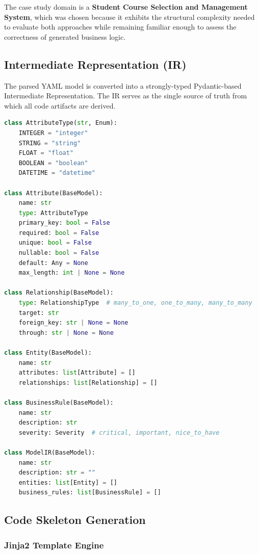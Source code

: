 \documentclass[11pt,a4paper]{article}
\begin{document}
The case study domain is a \textbf{Student Course Selection and Management System}, which was chosen because it exhibits the structural complexity needed to evaluate both approaches while remaining familiar enough to assess the correctness of generated business logic.

\subsection{Intermediate Representation (IR)}

The parsed YAML model is converted into a strongly-typed Pydantic-based Intermediate Representation. The IR serves as the single source of truth from which all code artifacts are derived.

\begin{lstlisting}[language=Python, caption={Pydantic IR model classes}, label={lst:ir}]
class AttributeType(str, Enum):
    INTEGER = "integer"
    STRING = "string"
    FLOAT = "float"
    BOOLEAN = "boolean"
    DATETIME = "datetime"

class Attribute(BaseModel):
    name: str
    type: AttributeType
    primary_key: bool = False
    required: bool = False
    unique: bool = False
    nullable: bool = False
    default: Any = None
    max_length: int | None = None

class Relationship(BaseModel):
    type: RelationshipType  # many_to_one, one_to_many, many_to_many
    target: str
    foreign_key: str | None = None
    through: str | None = None

class Entity(BaseModel):
    name: str
    attributes: list[Attribute] = []
    relationships: list[Relationship] = []

class BusinessRule(BaseModel):
    name: str
    description: str
    severity: Severity  # critical, important, nice_to_have

class ModelIR(BaseModel):
    name: str
    description: str = ""
    entities: list[Entity] = []
    business_rules: list[BusinessRule] = []
\end{lstlisting}

\subsection{Code Skeleton Generation}

\subsubsection{Jinja2 Template Engine}
\end{document}
